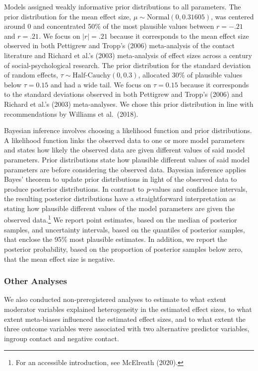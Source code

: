 \documentclass[12pt, letterpaper]{article}
\begin{document}
Models assigned weakly informative prior distributions to all
parameters. The prior distribution for the mean effect size,
\(\mu \sim \text{Normal}(0, 0.31605)\), was centered around 0 and
concentrated 50\% of the most plausible values between \(r = -.21\) and
\(r = .21\). We focus on \(|r| = .21\) because it corresponds to the
mean effect size observed in both Pettigrew and Tropp's (2006)
meta-analysis of the contact literature and Richard et al.'s (2003)
meta-analysis of effect sizes across a century of social-psychological
research. The prior distribution for the standard deviation of random
effects, \(\tau \sim \text{Half-Cauchy}(0, 0.3)\), allocated 30\% of
plausible values below \(\tau = 0.15\) and had a wide tail. We focus on
\(\tau = 0.15\) because it corresponds to the standard deviations
observed in both Pettigrew and Tropp's (2006) and Richard et al.'s
(2003) meta-analyses. We chose this prior distribution in line with
recommendations by Williams et al.~(2018).

Bayesian inference involves choosing a likelihood function and prior
distributions. A likelihood function links the observed data to one or
more model parameters and states how likely the observed data are given
different values of said model parameters. Prior distributions state how
plausible different values of said model parameters are before
considering the observed data. Bayesian inference applies Bayes' theorem
to update prior distributions in light of the observed data to produce
posterior distributions. In contrast to \emph{p}-values and confidence
intervals, the resulting posterior distributions have a straightforward
interpretation as stating how plausible different values of the model
parameters are given the observed data.\footnote{For an accessible
  introduction, see McElreath (2020).} We report point estimates, based
on the median of posterior samples, and uncertainty intervals, based on
the quantiles of posterior samples, that enclose the 95\% most plausible
estimates. In addition, we report the posterior probability, based on
the proportion of posterior samples below zero, that the mean effect
size is negative.

\hypertarget{other-analyses}{%
\subsubsection{Other Analyses}\label{other-analyses}}

We also conducted non-preregistered analyses to estimate to what extent
moderator variables explained heterogeneity in the estimated effect
sizes, to what extent meta-biases influenced the estimated effect sizes,
and to what extent the three outcome variables were associated with two
alternative predictor variables, ingroup contact and negative contact.
\end{document}
